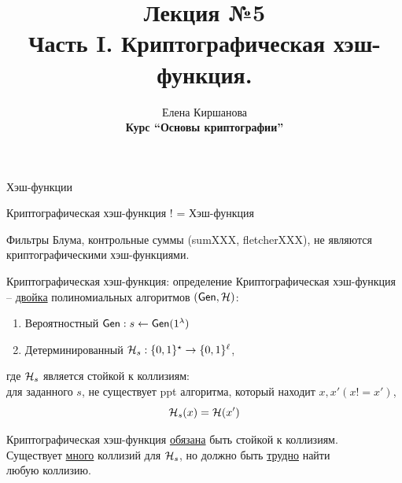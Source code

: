 \documentclass[usenames,dvipsnames,8pt,aspectratio=169]{beamer}
\title{Лекция №5 \\[10pt]
	Часть I. Криптографическая хэш-функция.}
\date{ Елена Киршанова \\  \textbf{Курс ``Основы криптографии''} \\  }
\begin{document}
	
\begin{frame}
	\titlepage
\end{frame}

\begin{frame}{Хэш-функции}

\Large
\begin{center}
	{\color{Orange} Криптографическая хэш-функция ! = Хэш-функция} \\[10pt]
\end{center}

Фильтры Блума, контрольные суммы (sumXXX, fletcherXXX),  не являются криптографическими хэш-функциями.


\end{frame}

\begin{frame}{Криптографическая хэш-функция: определение}
\Large
	{\color{Orange}Криптографическая хэш-функция} -- \underline{двойка} полиномиальных алгоритмов $(\textsf{Gen}, \mathcal{H})$:
	\begin{enumerate}
		\itemsep 7pt
		\item Вероятностный $\textsf{Gen}: s \leftarrow \textsf{Gen}(1^\lambda)$  
		\item Детерминированный $\mathcal{H}_s: \{0,1\}^\star \rightarrow \{0,1\}^\ell$,
	\end{enumerate}

где $\mathcal{H}_s$ является  {\color{Orange} стойкой к коллизиям}: \\[5pt]

для заданного $s$,  не существует ppt алгоритма, который находит $x, x' (x!=x')$,
\[
	\mathcal{H}_s(x) = \mathcal{H}(x')
\]

{\color{Orange} Криптографическая} хэш-функция \underline{обязана} быть стойкой к коллизиям.\\[5pt]

Существует  \underline{много} коллизий для $\mathcal{H}_s$, но должно быть \underline{трудно} найти \\ любую коллизию.
\end{frame}
\end{document}
